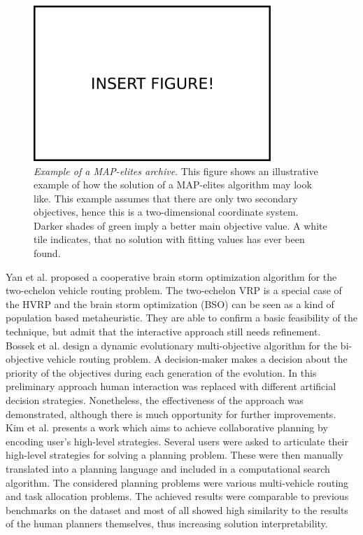 \begin{figure}
\centering
\includegraphics[width=0.8\textwidth]{img/insert_figure_here.png}
\caption[Example of a MAP-elites archive]{\label{fig:mapelites} \textit{Example of a MAP-elites archive}. This figure shows an illustrative example of how the solution of a MAP-elites algorithm may look like. This example assumes that there are only two secondary objectives, hence this is a two-dimensional coordinate system. Darker shades of green imply a better main objective value. A white tile indicates, that no solution with fitting values has ever been found.}
\end{figure}
Yan et al. \cite{yan_human_2016} proposed a cooperative brain storm optimization algorithm for the two-echelon vehicle routing problem. The two-echelon VRP is a special case of the HVRP and the brain storm optimization (BSO) can be seen as a kind of population based metaheuristic. They are able to confirm a basic feasibility of the technique, but admit that the interactive approach still needs refinement.\\
Bossek et al. \cite{bossek_towards_2020} design a dynamic evolutionary multi-objective algorithm for the bi-objective vehicle routing problem. A decision-maker makes a decision about the priority of the objectives during each generation of the evolution. In this preliminary approach human interaction was replaced with different artificial decision strategies. Nonetheless, the effectiveness of the approach was demonstrated, although there is much opportunity for further improvements.\\
Kim et al. \cite{kim_collaborative_2017} presents a work which aims to achieve collaborative planning by encoding user's high-level strategies. Several users were asked to articulate their high-level strategies for solving a planning problem. These were then manually translated into a planning language and included in a computational search algorithm. The considered planning problems were various multi-vehicle routing and task allocation problems. The achieved results were comparable to previous benchmarks on the dataset and most of all showed high similarity to the results of the human planners themselves, thus increasing solution interpretability.

